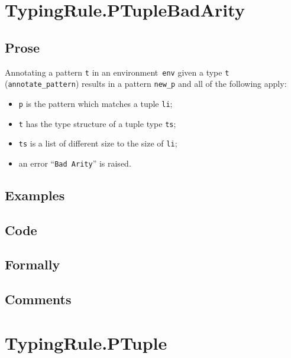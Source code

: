\documentclass{book}
\begin{document}
\section{TypingRule.PTupleBadArity \label{sec:TypingRule.PTupleBadArity}}

  \subsection{Prose}
   Annotating a pattern \texttt{t} in an environment~\texttt{env} given a type \texttt{t} (\texttt{annotate\_pattern}) results in a pattern \texttt{new\_p} and all of the following apply:
   \begin{itemize}
   \item \texttt{p} is the pattern which matches a tuple \texttt{li};
   \item \texttt{t} has the type structure of a tuple type \texttt{ts};
   \item \texttt{ts} is a list of different size to the size of \texttt{li};
   \item an error ``\texttt{Bad Arity}'' is raised. 
   \end{itemize}

  \subsection{Examples}

  \subsection{Code}

  \subsection{Formally}

  \subsection{Comments}


\section{TypingRule.PTuple \label{sec:TypingRule.PTuple}}
\end{document}
